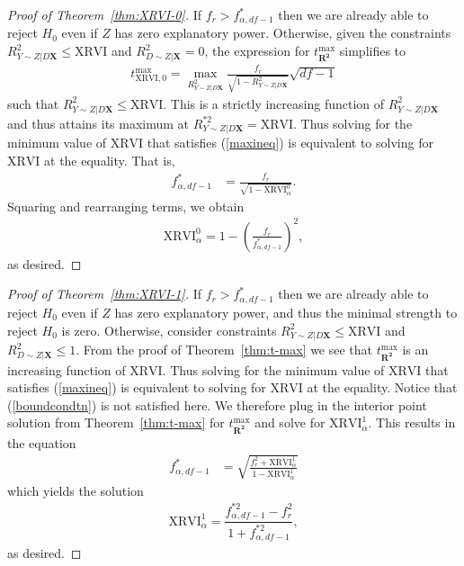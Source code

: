 \documentclass[sts]{imsart}
\theoremstyle{plain}
\theoremstyle{definition}
\newcommand{\df}{df}
\newcommand{\Ry}{R^2_{Y\sim Z | D\mathbf{X}}}
\newcommand{\Rd}{R^2_{D\sim Z | \mathbf{X}}}
\newcommand{\fstar}{f^*_{\alpha, \df-1}}
\newcommand{\fstarsq}{f^{* 2}_{\alpha, \df-1}}
\newcommand{\XRVI}{\text{XRVI}}
\newcommand{\Rystar}{R^{* 2}_{Y\sim Z | D\mathbf{X}}}
\begin{document}
\begin{appendix}
\begin{proof}[Proof of Theorem~\ref{thm:XRVI-0}]
    
    If $f_{r} > \fstar$ then we are already able to reject $H_0$ even if $Z$ has zero explanatory power.
    Otherwise, given the constraints $\Ry \leq \XRVI$ and $\Rd = 0$, the expression for $t_{\boldsymbol{R^2}}^{\max}$ simplifies to 
    \begin{align*}
    t_{\XRVI,0}^{\max} = \max_{\Ry} \frac{f_{r} }{\sqrt{1-\Ry}} \sqrt{\df-1} 
    \end{align*}
    such that $\Ry \leq \XRVI$.
    This is a strictly increasing function of $\Ry$ and thus attains its maximum at $\Rystar=\XRVI$. Thus solving for the minimum value of $\XRVI$ that satisfies (\ref{maxineq})
    is equivalent to solving for $\XRVI$ at the equality. That is,
    \begin{align*}
        \fstar &= \frac{f_{r} }{\sqrt{1-\XRVI^0_{\alpha}}}.
    \end{align*}
    Squaring and rearranging terms, we obtain
    \begin{align*}
        \XRVI^0_{\alpha} = 1-\left(\frac{f_{r} }{\fstar}\right)^2,
    \end{align*}
    as desired.
\end{proof}

\begin{proof}[Proof of Theorem~\ref{thm:XRVI-1}]
    If $f_{r} > \fstar$ then we are already able to reject $H_0$ even if $Z$ has zero explanatory power, and thus the minimal strength to reject $H_0$ is zero. 
    Otherwise, consider constraints $\Ry \leq \XRVI$ and $\Rd \leq 1$. From the proof of Theorem~\ref{thm:t-max} we see that $t_{\boldsymbol{R^2}}^{\max}$ is an increasing function of $\XRVI$. Thus solving for the minimum value of $\XRVI$ that satisfies (\ref{maxineq}) is equivalent to solving for $\XRVI$ at the equality. Notice that (\ref{boundcondtn}) is not satisfied here. We therefore plug in the interior point solution from Theorem~\ref{thm:t-max} for $t_{\boldsymbol{R^2}}^{\max}$ and solve for $\XRVI^{1}_{\alpha}$. This results in the equation
    \begin{align*}
        \fstar 
        &= \sqrt{\frac{f_{r} ^2 + \XRVI^{1}_{\alpha}}{1-\XRVI^{1}_{\alpha}}}
    \end{align*}
    which yields the solution 
    \begin{align*}
        \XRVI^{1}_{\alpha} = \dfrac{\fstarsq - f_{r} ^2}{1+\fstarsq},
    \end{align*}
as desired.
\end{proof}




\end{appendix}
\end{document}
